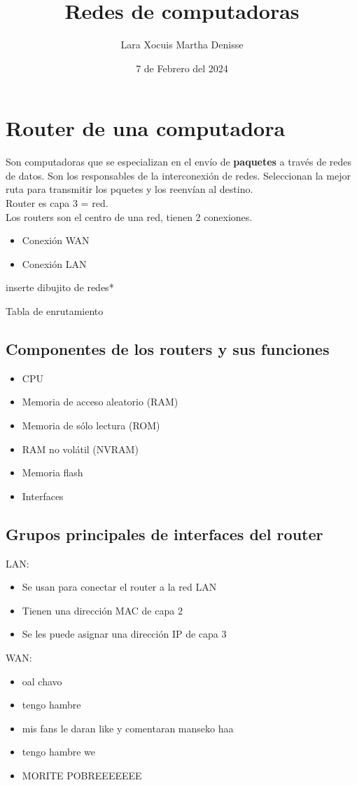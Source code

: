 \documentclass[letterpaper,12pt]{article}
\title {\textbf{Redes de computadoras}}
\author{Lara Xocuis Martha Denisse}
\date{7 de Febrero del 2024}
\begin{document}
\maketitle
\newpage
\begin{sloppypar}

\section{Router de una computadora}
Son computadoras que se especializan en el envío de \textbf{paquetes} a través de redes de datos. Son los responsables de la interconexión de redes. Seleccionan la mejor ruta para transmitir los pquetes y los reenvían al destino.
\vspace{0.3cm}\\ 
Router es capa 3 = red.
\vspace{0.3cm}\\
Los routers son el centro de una red, tienen 2 conexiones.
\begin{itemize}
    \item Conexión WAN 
    \item Conexión LAN
\end{itemize}

inserte dibujito de redes*

Tabla de enrutamiento

\subsection{Componentes de los routers y sus funciones} 
\begin{itemize}
    \item CPU 
    \item Memoria de acceso aleatorio (RAM)
    \item Memoria de sólo lectura (ROM)
    \item RAM no volátil (NVRAM)
    \item Memoria flash
    \item Interfaces
\end{itemize}

\subsection{Grupos principales de interfaces del router}
LAN:
\begin{itemize}
    \item Se usan para conectar el router a la red LAN 
    \item Tienen una dirección MAC de capa 2
    \item Se les puede asignar una dirección IP de capa 3
\end{itemize}
WAN:
\begin{itemize}
    \item oal chavo 
    \item tengo hambre
    \item mis fans le daran like y comentaran manseko haa
    \item tengo hambre we
    \item MORITE POBREEEEEEE
\end{itemize}


\end{sloppypar}
\end{document}
